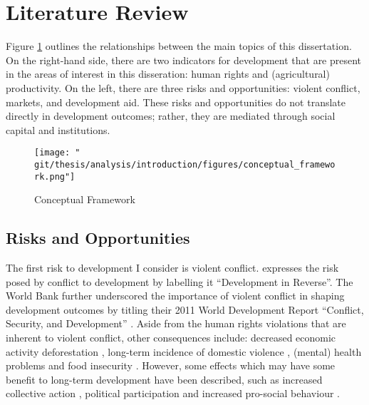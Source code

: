 \section{Literature Review}
Figure \ref{intro:fig:framework} outlines the relationships between the main topics of this dissertation. On the right-hand side, there are two indicators for development that are present in the areas of interest in this disseration: human rights and (agricultural) productivity. On the left, there are three risks and opportunities: violent conflict, markets, and development aid. These risks and opportunities do not translate directly in development outcomes; rather, they are mediated through social capital and institutions.

\begin{figure}[htb]
  \centering
  \texttt{[image: "\\git/thesis/analysis/introduction/figures/conceptual\_framework.png"]}
  \caption{Conceptual Framework}
  \label{intro:fig:framework}
\end{figure}

\subsection{Risks and Opportunities}
The first risk to development I consider is violent conflict. \citet{Collier2003}  expresses the risk posed by conflict to development by labelling it ``Development in Reverse''. The World Bank further underscored the importance of violent conflict in shaping development outcomes by titling their 2011 World Development Report ``Conflict, Security, and Development'' \citep{WorldBank2011}. Aside from the human rights violations that are inherent to violent conflict, other consequences include: decreased economic activity \citep{Collier1999} deforestation \cite[e.g.][]{Connectiona}, long-term incidence of domestic violence \citep[e.g.][]{LaMattina2017, Muller2019}, (mental) health problems \cite[e.g.][]{Smith2002, Iqbal2006a,Akresh2011} and food insecurity \cite[e.g.][]{Lecoutere2005, Verwimp2012}. However, some effects which may have some benefit to long-term development have been described, such as increased collective action \citep{Bellows2009b}, political participation \citep{Blattman2009a} and increased pro-social behaviour \citep{Voors2012a}.

